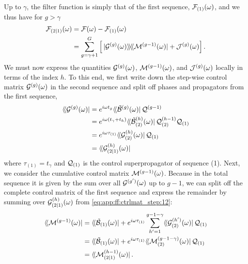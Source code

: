 Up to $\gamma$, the filter function is simply that of the first sequence, $\mathcal{F}_{(1)}(\omega)$, and we thus have for $g>\gamma$
\begin{align}
    \FF_{(2|1)}(\omega) &= \FF(\omega) - \FF_{(1)}(\omega) \notag \\
                        &= \sum_{g=\gamma+1}^{G}\left[
                            \dop*{\mc{G}\gth{g}(\omega)}{\mc{M}\gth{g-1}(\omega)} + \mc{J}\gth{g}(\omega)
                        \right].\label{eq:app:ff:filter_function:12:2}
\end{align}
We must now express the quantities $\mathcal{G}^{(g)}(\omega)$, $\mathcal{M}^{(g-1)}(\omega)$, and $\mathcal{J}^{(g)}(\omega)$ locally in terms of the index $h$.
To this end, we first write down the step-wise control matrix $\mathcal{G}^{(g)}(\omega)$ in the second sequence and split off phases and propagators from the first sequence,
\begin{align}\label{eq:app:ff:ctrlmat_step:12}
    \dbra*{\mc{G}\gth{g}(\omega)} &= \e^{\i\omega t_{g}}\dbra*{\ctrlmat\gth{g}(\omega)}\liouvQ\gth{g-1} \notag \\
                                  &= \e^{\i\omega (t_\gamma + t_{h})}\dbra*{\ctrlmat_{(2)}\gth{h}(\omega)}\liouvQ_{(2)}\gth{h-1}\liouvQ_{(1)} \notag \\
                                  &= \e^{\i\omega\tau_{(1)}}\dbra*{\mc{G}_{(2)}\gth{h}(\omega)}\liouvQ_{(1)} \notag \\
                                  &= \dbra*{\mc{G}_{(2|1)}\gth{h}(\omega)}
\end{align}
where $\tau_{(1)}=t_{\gamma}$ and $\mathcal{Q}_{(1)}$ is the control superpropagator of sequence (1).
Next, we consider the cumulative control matrix $\mathcal{M}^{(g-1)}(\omega)$.
Because in the total sequence it is given by the sum over all $\mathcal{G}^{(g^{\prime})}(\omega)$ up to $g-1$, we can split off the complete control matrix of the first sequence and express the remainder by summing over $\mathcal{G}^{(h)}_{(2|1)}(\omega)$ from \cref{eq:app:ff:ctrlmat_step:12}:
\begin{align}
    \dbra*{\mc{M}\gth{g-1}(\omega)} &= \dbra*{\ctrlmat_{(1)}(\omega)} + \e^{\i\omega\tau_{(1)}}\sum_{h^{\prime}=1}^{g-1-\gamma}
                                        \dbra*{\mc{G}_{(2)}\gth{h^{\prime}}(\omega)}\liouvQ_{(1)} \notag \\
                                    &= \dbra*{\ctrlmat_{(1)}(\omega)} + \e^{\i\omega\tau_{(1)}}\dbra*{\mc{M}_{(2)}\gth{g-1-\gamma}(\omega)}\liouvQ_{(1)} \notag \\
                                    &= \dbra*{\mc{M}_{(2|1)}\gth{h-1}(\omega)}. \label{eq:app:ff:ctrlmat_cumulative:12:2}
\end{align}
